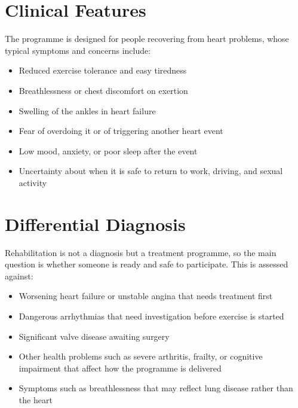 \section*{Clinical Features}
The programme is designed for people recovering from heart problems, whose typical symptoms and concerns include:
\begin{itemize}
    \item Reduced exercise tolerance and easy tiredness
    \item Breathlessness or chest discomfort on exertion
    \item Swelling of the ankles in heart failure
    \item Fear of overdoing it or of triggering another heart event
    \item Low mood, anxiety, or poor sleep after the event
    \item Uncertainty about when it is safe to return to work, driving, and sexual activity
\end{itemize}

\section*{Differential Diagnosis}
Rehabilitation is not a diagnosis but a treatment programme, so the main question is whether someone is ready and safe to participate. This is assessed against:
\begin{itemize}
    \item Worsening heart failure or unstable angina that needs treatment first
    \item Dangerous arrhythmias that need investigation before exercise is started
    \item Significant valve disease awaiting surgery
    \item Other health problems such as severe arthritis, frailty, or cognitive impairment that affect how the programme is delivered
    \item Symptoms such as breathlessness that may reflect lung disease rather than the heart
\end{itemize}

